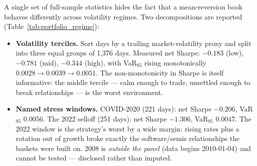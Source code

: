 A single set of full-sample statistics hides the fact that a mean-reversion book behaves
differently across volatility regimes. Two decompositions are reported
(Table~\ref{tab:portfolio_regime}):
\begin{itemize}
  \item \textbf{Volatility terciles.} Sort days by a trailing market-volatility proxy and
    split into three equal groups of 1{,}376 days. Measured net Sharpe: $-0.183$ (low),
    $-0.781$ (mid), $-0.344$ (high), with VaR$_{95}$ rising monotonically
    $0.0028\to0.0039\to0.0051$. The non-monotonicity in Sharpe is itself informative: the
    middle tercile --- calm enough to trade, unsettled enough to break relationships ---
    is the worst environment.
  \item \textbf{Named stress windows.} COVID-2020 (221 days): net Sharpe $-0.206$,
    VaR$_{95}$ $0.0056$. The 2022 selloff (251 days): net Sharpe $-1.306$, VaR$_{95}$
    $0.0047$. The 2022 window is the strategy's worst by a wide margin: rising rates plus
    a rotation out of growth broke exactly the software/semis relationships the baskets
    were built on. 2008 is \emph{outside the panel} (data begins 2010-01-04) and cannot be
    tested --- disclosed rather than imputed.
\end{itemize}
